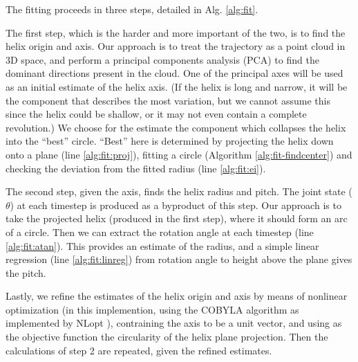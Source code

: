 \documentclass[letterpaper, 10 pt, conference]{ieeeconf}  %
\begin{document}
The fitting proceeds in three steps, detailed in Alg. \ref{alg:fit}.

The first step, which is the harder and more important of the two, is to find the helix origin and axis. Our approach is to treat the trajectory as a point cloud in 3D space, and perform a principal components analysis (PCA) to find the dominant directions present in the cloud. One of the principal axes will be used as an initial estimate of the helix axis. (If the helix is long and narrow, it will be the component that describes the most variation, but we cannot assume this since the helix could be shallow, or it may not even contain a complete revolution.) We choose for the estimate the component which collapses the helix into the ``best'' circle. ``Best'' here is determined by projecting the helix down onto a plane (line \ref{alg:fit:proj}), fitting a circle (Algorithm \ref{alg:fit-findcenter}) and checking the deviation from the fitted radius (line \ref{alg:fit:ei}).

The second step, given the axis, finds the helix radius and pitch. The joint state ($\theta$) at each timestep is produced as a byproduct of this step. Our approach is to take the projected helix (produced in the first step), where it should form an arc of a circle. Then we can extract the rotation angle at each timestep (line \ref{alg:fit:atan}). This provides an estimate of the radius, and a simple linear regression (line \ref{alg:fit:linreg}) from rotation angle to height above the plane gives the pitch.

Lastly, we refine the estimates of the helix origin and axis by means of nonlinear optimization (in this implemention, using the COBYLA algorithm \cite{cobyla} as implemented by NLopt \cite{nlopt}), contraining the axis to be a unit vector, and using as the objective function the circularity of the helix plane projection. Then the calculations of step 2 are repeated, given the refined estimates.
\end{document}
